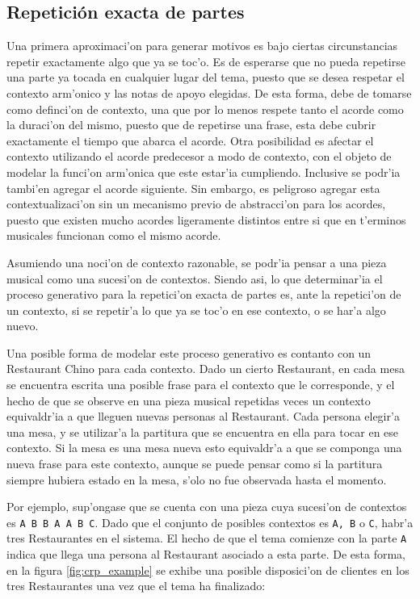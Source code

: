 \subsection{Repetici\'on exacta de partes}
\label{sec:crp_model}
Una primera aproximaci'on para generar motivos es bajo ciertas circunstancias repetir exactamente algo que ya se toc'o. Es de esperarse que no pueda repetirse
una parte ya tocada en cualquier lugar del tema, puesto que se desea respetar el contexto arm'onico y las notas de apoyo elegidas. De esta forma, debe
de tomarse como definci'on de contexto, una que por lo menos respete tanto el acorde como la duraci'on del mismo, puesto que de repetirse una frase, esta 
debe cubrir exactamente el tiempo que abarca el acorde. Otra posibilidad es afectar el contexto utilizando el acorde predecesor a modo de contexto, con el objeto
de modelar la funci'on arm'onica que este estar'ia cumpliendo. Inclusive se podr'ia tambi'en agregar el acorde siguiente. Sin embargo, es peligroso agregar
esta contextualizaci'on sin un mecanismo previo de abstracci'on para los acordes, puesto que existen mucho acordes ligeramente distintos entre si que en t'erminos
musicales funcionan como el mismo acorde.

Asumiendo una noci'on de contexto razonable, se podr'ia pensar a una pieza musical como una sucesi'on de contextos. Siendo asi, lo que determinar'ia el proceso generativo para 
la repetici'on exacta de partes es, ante la repetici'on de un contexto, si se repetir'a lo que ya se toc'o en ese contexto, o se har'a
algo nuevo. 

Una posible forma de modelar este proceso generativo es contanto con un Restaurant Chino para cada contexto. Dado un cierto Restaurant, en cada mesa se encuentra
escrita una posible frase para el contexto que le corresponde, y el hecho de que se observe en una pieza musical repetidas veces un contexto equivaldr'ia a que lleguen nuevas
personas al Restaurant. Cada persona elegir'a una mesa, y se utilizar'a la partitura que se encuentra en ella para tocar en ese contexto. Si la mesa es una mesa 
nueva esto equivaldr'a a que se componga una nueva frase para este contexto, aunque se puede pensar como si la partitura siempre hubiera estado en la mesa, s'olo 
no fue observada hasta el momento.  

Por ejemplo, sup'ongase que se cuenta con una pieza cuya sucesi'on de contextos es \texttt{A B B A A B C}. Dado que el conjunto de posibles contextos es
\texttt{A, B} o \texttt{C}, habr'a tres Restaurantes en el sistema. El hecho de que el tema comienze con la parte \texttt{A} indica que llega una persona al 
Restaurant asociado a esta parte. De esta forma, en la figura \ref{fig:crp_example} se exhibe una posible disposici'on de clientes en los tres Restaurantes 
una vez que el tema ha finalizado:

